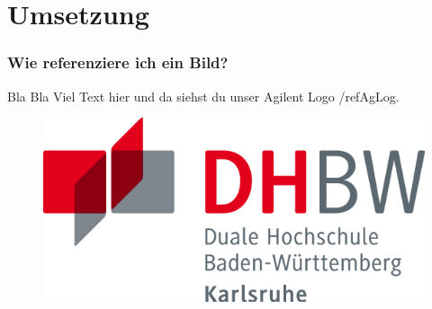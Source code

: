 \chapter{Umsetzung}




\subsection{Wie referenziere ich ein Bild?}

Bla Bla Viel Text hier und da siehst du unser \ac{Agilent} Logo /ref{AgLog}.

\begin{figure}[h]
	\centering
	\includegraphics[scale=0.6]{img/dhbw-logo.png}
\end{figure}
